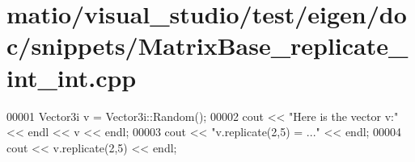 \hypertarget{matio_2visual__studio_2test_2eigen_2doc_2snippets_2_matrix_base__replicate__int__int_8cpp_source}{}\section{matio/visual\+\_\+studio/test/eigen/doc/snippets/\+Matrix\+Base\+\_\+replicate\+\_\+int\+\_\+int.cpp}
\label{matio_2visual__studio_2test_2eigen_2doc_2snippets_2_matrix_base__replicate__int__int_8cpp_source}

\begin{DoxyCode}
00001 Vector3i v = Vector3i::Random();
00002 cout << \textcolor{stringliteral}{"Here is the vector v:"} << endl << v << endl;
00003 cout << \textcolor{stringliteral}{"v.replicate(2,5) = ..."} << endl;
00004 cout << v.replicate(2,5) << endl;
\end{DoxyCode}

